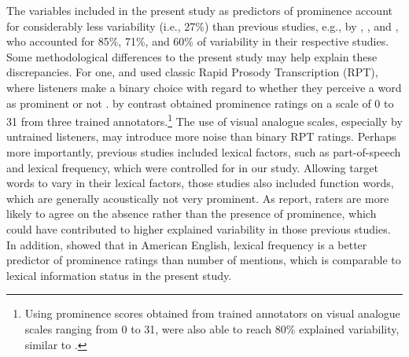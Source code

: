 The variables included in the present study as predictors of prominence account for considerably less variability (i.e., 27\%) than previous studies, e.g., by \citet{arnoldUsingGeneralizedAdditive2013}, \citet{baumannWhatMakesWord2018}, and \citet{wagnerExploitingSpeechgestureLink2019}, who accounted for 85\%, 71\%, and 60\% of variability in their respective studies. Some methodological differences to the present study may help explain these discrepancies. For one, \citet{baumannWhatMakesWord2018} and \citet{wagnerExploitingSpeechgestureLink2019} used classic Rapid Prosody Transcription (RPT), where listeners make a binary choice with regard to whether they perceive a word as prominent or not \citep[e.g.,][]{coleSignalbasedExpectationbasedFactors2010}. \citet{arnoldUsingGeneralizedAdditive2013} by contrast obtained prominence ratings on a scale of 0 to 31 from three trained annotators.\footnote{Using prominence scores obtained from trained annotators on visual analogue scales ranging from 0 to 31, \citet{wagnerExploitingSpeechgestureLink2019} were also able to reach 80\% explained variability, similar to \citet{arnoldUsingGeneralizedAdditive2013}.} The use of visual analogue scales, especially by untrained listeners, may introduce more noise than binary RPT ratings. Perhaps more importantly, previous studies included lexical factors, such as part-of-speech and lexical frequency, which were controlled for in our study. Allowing target words to vary in their lexical factors, those studies also included function words, which are generally acoustically not very prominent. As \citet{coleNewMethodsProsodic2016} report, raters are more likely to agree on the absence rather than the presence of prominence, which could have contributed to higher explained variability in those previous studies. In addition, \citet{coleSignalbasedExpectationbasedFactors2010} showed that in American English, lexical frequency is a better predictor of prominence ratings than number of mentions, which is comparable to lexical information status in the present study.

